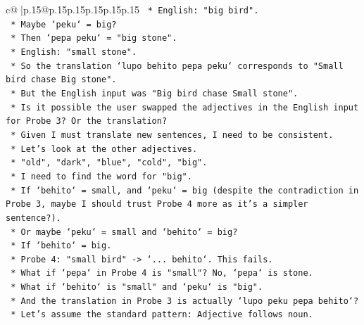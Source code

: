 \documentclass{article}
\begin{document}
{\begin{supertabular}{c@{$\;$}|p{.15\linewidth}@{}p{.15\linewidth}p{.15\linewidth}p{.15\linewidth}p{.15\linewidth}p{.15\linewidth}}
{{{\texttt{                            *   English: "big bird".} \\
\texttt{                            *   Maybe `peku` = big?} \\
\texttt{                            *   Then `pepa peku` = "big stone".} \\
\texttt{                            *   English: "small stone".} \\
\texttt{                            *   So the translation `lupo behito pepa peku` corresponds to "Small bird chase Big stone".} \\
\texttt{                            *   But the English input was "Big bird chase Small stone".} \\
\texttt{                            *   Is it possible the user swapped the adjectives in the English input for Probe 3? Or the translation?} \\
\texttt{                            *   Given I must translate new sentences, I need to be consistent.} \\
\texttt{                            *   Let's look at the other adjectives.} \\
\texttt{                            *   "old", "dark", "blue", "cold", "big".} \\
\texttt{                            *   I need to find the word for "big".} \\
\texttt{                            *   If `behito` = small, and `peku` = big (despite the contradiction in Probe 3, maybe I should trust Probe 4 more as it's a simpler sentence?).} \\
\texttt{                            *   Or maybe `peku` = small and `behito` = big?} \\
\texttt{                            *   If `behito` = big.} \\
\texttt{                            *   Probe 4: "small bird" {-}> `... behito`. This fails.} \\
\texttt{                            *   What if `pepa` in Probe 4 is "small"? No, `pepa` is stone.} \\
\texttt{                            *   What if `behito` is "small" and `peku` is "big".} \\
\texttt{                            *   And the translation in Probe 3 is actually `lupo peku pepa behito`?} \\
\texttt{                            *   Let's assume the standard pattern: Adjective follows noun.} \\
}}}
\end{supertabular}}
\end{document}
